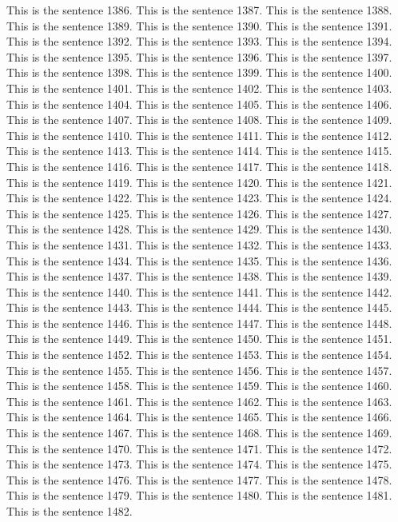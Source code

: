\documentclass{article}
\begin{document}
This is the sentence 1386.
This is the sentence 1387.
This is the sentence 1388.
This is the sentence 1389.
This is the sentence 1390.
This is the sentence 1391.
This is the sentence 1392.
This is the sentence 1393.
This is the sentence 1394.
This is the sentence 1395.
This is the sentence 1396.
This is the sentence 1397.
This is the sentence 1398.
This is the sentence 1399.
This is the sentence 1400.
This is the sentence 1401.
This is the sentence 1402.
This is the sentence 1403.
This is the sentence 1404.
This is the sentence 1405.
This is the sentence 1406.
This is the sentence 1407.
This is the sentence 1408.
This is the sentence 1409.
This is the sentence 1410.
This is the sentence 1411.
This is the sentence 1412.
This is the sentence 1413.
This is the sentence 1414.
This is the sentence 1415.
This is the sentence 1416.
This is the sentence 1417.
This is the sentence 1418.
This is the sentence 1419.
This is the sentence 1420.
This is the sentence 1421.
This is the sentence 1422.
This is the sentence 1423.
This is the sentence 1424.
This is the sentence 1425.
This is the sentence 1426.
This is the sentence 1427.
This is the sentence 1428.
This is the sentence 1429.
This is the sentence 1430.
This is the sentence 1431.
This is the sentence 1432.
This is the sentence 1433.
This is the sentence 1434.
This is the sentence 1435.
This is the sentence 1436.
This is the sentence 1437.
This is the sentence 1438.
This is the sentence 1439.
This is the sentence 1440.
This is the sentence 1441.
This is the sentence 1442.
This is the sentence 1443.
This is the sentence 1444.
This is the sentence 1445.
This is the sentence 1446.
This is the sentence 1447.
This is the sentence 1448.
This is the sentence 1449.
This is the sentence 1450.
This is the sentence 1451.
This is the sentence 1452.
This is the sentence 1453.
This is the sentence 1454.
This is the sentence 1455.
This is the sentence 1456.
This is the sentence 1457.
This is the sentence 1458.
This is the sentence 1459.
This is the sentence 1460.
This is the sentence 1461.
This is the sentence 1462.
This is the sentence 1463.
This is the sentence 1464.
This is the sentence 1465.
This is the sentence 1466.
This is the sentence 1467.
This is the sentence 1468.
This is the sentence 1469.
This is the sentence 1470.
This is the sentence 1471.
This is the sentence 1472.
This is the sentence 1473.
This is the sentence 1474.
This is the sentence 1475.
This is the sentence 1476.
This is the sentence 1477.
This is the sentence 1478.
This is the sentence 1479.
This is the sentence 1480.
This is the sentence 1481.
This is the sentence 1482.
\end{document}
